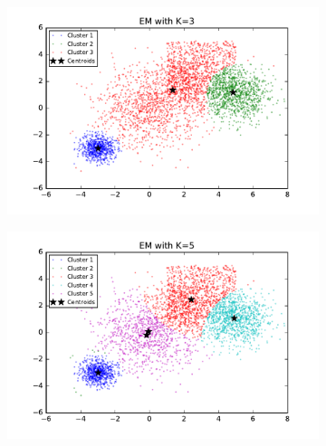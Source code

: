 \begin{description}
\begin{description}
\begin{figure}[!h]
        \centering
        \begin{subfigure}[b]{0.475\textwidth}
            \centering
            \includegraphics[width=\textwidth]{./figures/bigClustering_EM_3.pdf}
        \end{subfigure}
        \hfill      
        \begin{subfigure}[b]{0.475\textwidth}  
            \centering 
            \includegraphics[width=\textwidth]{./figures/bigClustering_EM_5.pdf}
        \end{subfigure}   
        \begin{subfigure}[b]{0.475\textwidth}   
            \centering 

\end{subfigure}
\end{figure}
\end{description}
\end{description}
